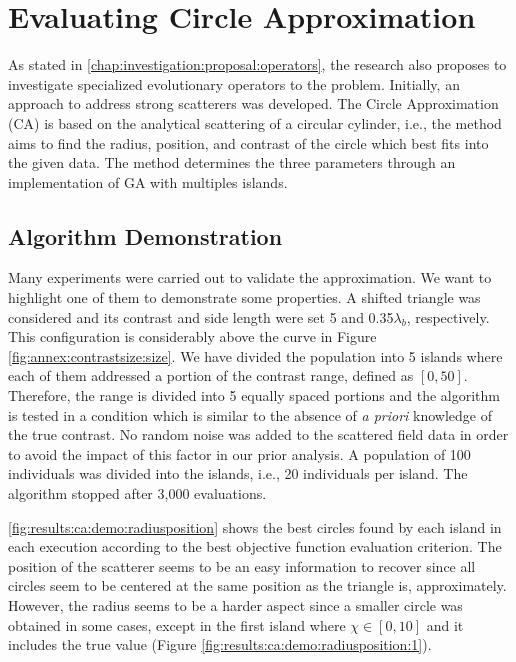			
	\section{Evaluating Circle Approximation}\label{chap:results:ca}
	
		As stated in \autoref{chap:investigation:proposal:operators}, the research also proposes to investigate specialized evolutionary operators to the problem. Initially, an approach to address strong scatterers was developed. The Circle Approximation (CA) is based on the analytical scattering of a circular cylinder, i.e., the method aims to find the radius, position, and contrast of the circle which best fits into the given data. The method determines the three parameters through an implementation of GA with multiples islands.
		
		\subsection{Algorithm Demonstration}\label{chap:results:ca:demo}
		
			Many experiments were carried out to validate the approximation. We want to highlight one of them to demonstrate some properties. A shifted triangle was considered and its contrast and side length were set 5 and 0.35$\lambda_b$, respectively. This configuration is considerably above the curve in Figure \ref{fig:annex:contrastsize:size}. We have divided the population into 5 islands where each of them addressed a portion of the contrast range, defined as $[0, 50]$. Therefore, the range is divided into 5 equally spaced portions and the algorithm is tested in a condition which is similar to the absence of \textit{a priori} knowledge of the true contrast. No random noise was added to the scattered field data in order to avoid the impact of this factor in our prior analysis. A population of 100 individuals was divided into the islands, i.e., 20 individuals per island. The algorithm stopped after 3,000 evaluations.
			
			\autoref{fig:results:ca:demo:radiusposition} shows the best circles found by each island in each execution according to the best objective function evaluation criterion. The position of the scatterer seems to be an easy information to recover since all circles seem to be centered at the same position as the triangle is, approximately. However, the radius seems to be a harder aspect since a smaller circle was obtained in some cases, except in the first island where $\chi\in[0,10]$ and it includes the true value (Figure \ref{fig:results:ca:demo:radiusposition:1}).
			
